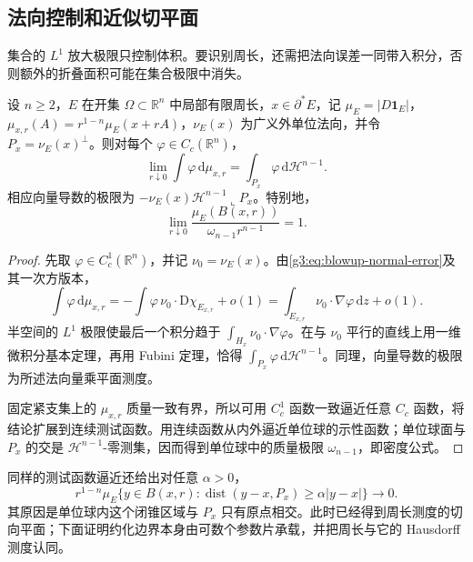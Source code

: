 \subsection{法向控制和近似切平面}
\label{g3:subsec:2104:04}
集合的 \(L^1\) 放大极限只控制体积。要识别周长，还需把法向误差一同带入积分，否则额外的折叠面积可能在集合极限中消失。

\begin{proposition}\label{g3:prop:perimeter-plane-blowup}
	设 \(n\ge2\)，\(E\) 在开集 \(\Omega\subset\mathbb R^n\) 中局部有限周长，\(x\in\partial^*E\)，记 \(\mu_E=|D\mathbf1_E|\)，\(\mu_{x,r}(A)=r^{1-n}\mu_E(x+rA)\)，\(\nu_E(x)\) 为广义外单位法向，并令 \(P_x=\nu_E(x)^\perp\)。则对每个 \(\varphi\in C_c(\mathbb R^n)\)，
	\begin{equation}\label{g3:eq:perimeter-plane-blowup}
		\lim_{r\downarrow0}\int\varphi\,\mathrm d\mu_{x,r}
		=\int_{P_x}\varphi\,\mathrm d\mathcal H^{n-1}.
	\end{equation}
	相应向量导数的极限为
	\(-\nu_E(x)\mathcal H^{n-1}\llcorner P_x\)。特别地，
	\begin{equation}\label{g3:eq:reduced-perimeter-density-one}
		\lim_{r\downarrow0}\frac{\mu_E(B(x,r))}{\omega_{n-1}r^{n-1}}=1.
	\end{equation}
\end{proposition}
\begin{proof}
	先取 \(\varphi\in C_c^1(\mathbb R^n)\)，并记 \(\nu_0=\nu_E(x)\)。由\eqref{g3:eq:blowup-normal-error}及其一次方版本，
	\[
		\int\varphi\,\mathrm d\mu_{x,r}
		=-\int\varphi\,\nu_0\cdot\mathrm D\chi_{E_{x,r}}+o(1)
		=\int_{E_{x,r}}\nu_0\cdot\nabla\varphi\,\mathrm dz+o(1).
	\]
	半空间的 \(L^1\) 极限使最后一个积分趋于
	\(\int_{H_x}\nu_0\cdot\nabla\varphi\)。在与 \(\nu_0\) 平行的直线上用一维微积分基本定理，再用 Fubini 定理，恰得
	\(\int_{P_x}\varphi\,\mathrm d\mathcal H^{n-1}\)。同理，向量导数的极限为所述法向量乘平面测度。

	固定紧支集上的 \(\mu_{x,r}\) 质量一致有界，所以可用 \(C_c^1\) 函数一致逼近任意 \(C_c\) 函数，将结论扩展到连续测试函数。用连续函数从内外逼近单位球的示性函数；单位球面与 \(P_x\) 的交是 \(\mathcal H^{n-1}\)-零测集，因而得到单位球中的质量极限 \(\omega_{n-1}\)，即密度公式。
\end{proof}

同样的测试函数逼近还给出对任意 \(\alpha>0\)，
\[
	r^{1-n}\mu_E\{y\in B(x,r):
	\operatorname{dist}(y-x,P_x)\ge\alpha|y-x|\}\longrightarrow0.
\]
其原因是单位球内这个闭锥区域与 \(P_x\) 只有原点相交。此时已经得到周长测度的切向平面；下面证明约化边界本身由可数个参数片承载，并把周长与它的 Hausdorff 测度认同。

